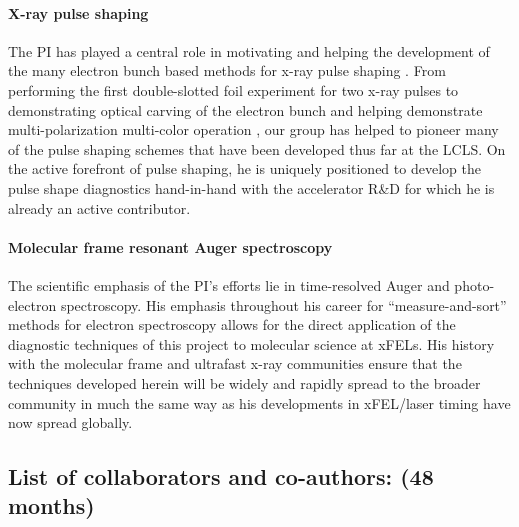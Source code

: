 \paragraph*{X-ray pulse shaping}
The PI has played a central role in motivating and helping the development of the many electron bunch based methods for x-ray pulse shaping \cite{Lutman13_twocolor,Marinelli13_twocolor,Helml2014,Marinelli2015,Lutman2016,Marinelli2016}.
From performing the first double-slotted foil experiment for two x-ray pulses \cite{CoffeeDAMOP11} to demonstrating optical carving of the electron bunch \cite{Marinelli2016} and helping demonstrate multi-polarization multi-color operation \cite{Lutman2016}, our group has helped to pioneer many of the pulse shaping schemes that have been developed thus far at the LCLS.
On the active forefront of pulse shaping, he is uniquely positioned to develop the pulse shape diagnostics hand-in-hand with the accelerator R\&D for which he is already an active contributor.

\paragraph*{Molecular frame resonant Auger spectroscopy}
The scientific emphasis of the PI's efforts lie in time-resolved Auger and photo-electron spectroscopy.
His emphasis throughout his career for ``measure-and-sort'' methods for electron spectroscopy allows for the direct application of the diagnostic techniques of this project to molecular science at xFELs.
His history with the molecular frame \cite{Broege08,Cryan09,Cryan10,Advances2011,CryanJPB} and ultrafast x-ray communities \cite{Glownia10,Fang10,Hoener10,Duesterer11,CoffeeDAMOP11,Meyer12,Frasinski2013,Rudek13,Katayama2013,McFarland2014} ensure that the techniques developed herein will be widely and rapidly spread to the broader community in much the same way as his developments in xFEL/laser timing \cite{Bionta11,Harmand13,MinaRSI,Nick2014} have now spread globally.

\subsection*{List of collaborators and co-authors: (48 months)}

